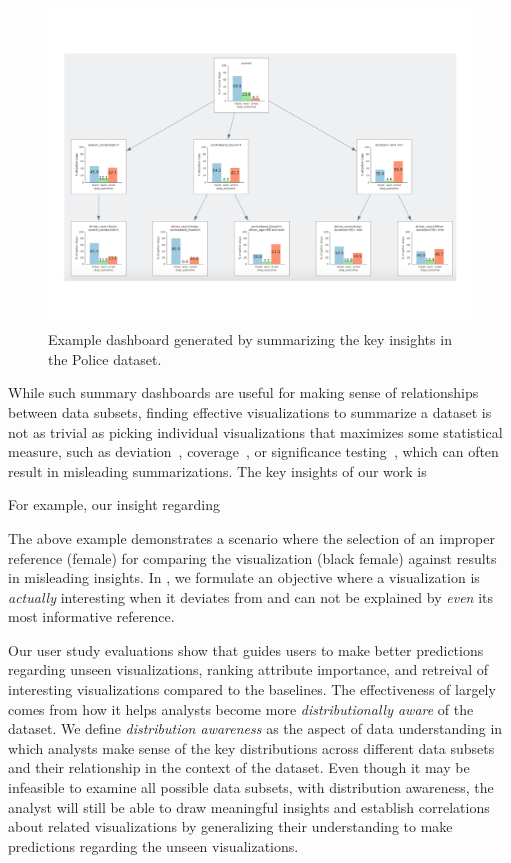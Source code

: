 \begin{figure}[h!]
\label{fig:sbd}
\centering
\includegraphics[width=0.7\linewidth]{figures/storyboard.pdf}
\caption{Example dashboard generated by \sbd summarizing the key insights in the Police dataset.}
\end{figure} 
\par While such summary dashboards are useful for making sense of relationships between data subsets, finding effective visualizations to summarize a dataset is not as trivial as picking individual visualizations that maximizes some statistical measure, such as deviation~\cite{Vartak2015}, coverage~\cite{Sarvghad2017}, or significance testing~\cite{Anand2015}, which can often result in misleading summarizations. The key insights of our work is 


For example, our insight regarding 

The above example demonstrates a scenario where the selection of an improper reference (female) for comparing the visualization (black female) against results in misleading insights. In \sbd, we formulate an objective where a visualization is \emph{actually} interesting when it deviates from and can not be explained by \emph{even} its most informative reference.

\par Our user study evaluations show that \sbd guides users to make better predictions regarding unseen visualizations, ranking attribute importance, and retreival of interesting visualizations compared to the baselines. The effectiveness of \sbd largely comes from how it helps analysts become more \emph{distributionally aware} of the dataset. We define \emph{distribution awareness} as the aspect of data understanding in which analysts make sense of the key distributions across different data subsets and their relationship in the context of the dataset. Even though it may be infeasible to examine all possible data subsets, with distribution awareness, the analyst will still be able to draw meaningful insights and establish correlations about related visualizations by generalizing their understanding to make predictions regarding the unseen visualizations. 

